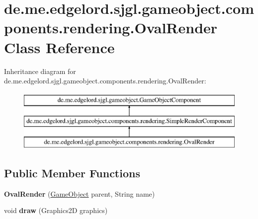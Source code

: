 \hypertarget{classde_1_1me_1_1edgelord_1_1sjgl_1_1gameobject_1_1components_1_1rendering_1_1_oval_render}{}\section{de.\+me.\+edgelord.\+sjgl.\+gameobject.\+components.\+rendering.\+Oval\+Render Class Reference}
\label{classde_1_1me_1_1edgelord_1_1sjgl_1_1gameobject_1_1components_1_1rendering_1_1_oval_render}
Inheritance diagram for de.\+me.\+edgelord.\+sjgl.\+gameobject.\+components.\+rendering.\+Oval\+Render\+:\begin{figure}[H]
\begin{center}
\leavevmode
\includegraphics[height=3.000000cm]{classde_1_1me_1_1edgelord_1_1sjgl_1_1gameobject_1_1components_1_1rendering_1_1_oval_render}
\end{center}
\end{figure}
\subsection*{Public Member Functions}
\begin{DoxyCompactItemize}
\item 
\mbox{\label{classde_1_1me_1_1edgelord_1_1sjgl_1_1gameobject_1_1components_1_1rendering_1_1_oval_render_a06b36575c36c5b17eef9cb79ea783bf3}} 
{\bfseries Oval\+Render} (\mbox{\hyperlink{classde_1_1me_1_1edgelord_1_1sjgl_1_1gameobject_1_1_game_object}{Game\+Object}} parent, String name)
\item 
\mbox{\label{classde_1_1me_1_1edgelord_1_1sjgl_1_1gameobject_1_1components_1_1rendering_1_1_oval_render_a08198cb65c66e27c6eb0574f4ea09c84}} 
void {\bfseries draw} (Graphics2D graphics)
\end{DoxyCompactItemize}
